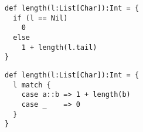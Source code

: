 \documentclass[10pt]{article}\usepackage[nu]{esial}
\begin{document}
\begin{Reponse}
\medskip\noindent
\begin{minipage}{.48\linewidth}
  \begin{Verbatim}[label=écriture fonctionnelle (sans return)]
def length(l:List[Char]):Int = {
  if (l == Nil)
    0
  else 
    1 + length(l.tail)
}
  \end{Verbatim}  
\end{minipage}\hfill%
\begin{minipage}{.48\linewidth}
  \begin{Verbatim}[numbers=right,label=avec un zoli filtrage]
def length(l:List[Char]):Int = {
  l match {
    case a::b => 1 + length(b)
    case _    => 0
  }
}
  \end{Verbatim}  
\end{minipage}

\end{Reponse}
\end{document}
